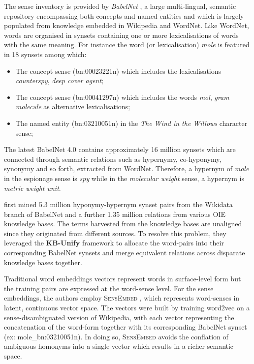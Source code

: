 The sense inventory is provided by \textit{BabelNet} \citep{navigli2012babelnet}, a large multi-lingual, semantic repository encompassing both concepts and named entities and which is largely populated from knowledge embedded in Wikipedia and WordNet.  Like WordNet, words are organised in synsets containing one or more lexicalisations of words with the same meaning.  For instance the word (or lexicalisation) \textit{mole} is featured in 18 synsets among which:
\begin{itemize}
    \item The concept  sense (bn:00023221n) which includes the lexicalisations \textit{counterspy}, \textit{deep cover agent};
    \item The concept  sense (bn:00041297n) which includes the words \textit{mol}, \textit{gram molecule} as alternative lexicalisations;
    \item The named entity  (bn:03210051n) in the \textit{The Wind in the Willows} character sense;
\end{itemize}
The latest BabelNet 4.0 contains approximately 16 million synsets which are connected through semantic relations such as hypernymy, co-hyponymy, synonymy and so forth, extracted from WordNet.  Therefore, a hypernym of \textit{mole} in the espionage sense is \textit{spy} while in the \textit{molecular weight} sense, a hypernym is \textit{metric weight unit}.

\citeauthor{espinosa2016supervised} first mined 5.3 million hyponymy-hypernym synset pairs from the Wikidata branch of BabelNet and a further 1.35 million relations from various OIE knowledge bases.  The terms harvested from the knowledge bases are unaligned since they originated from different sources.  To resolve this problem, they leveraged the \textbf{KB-Unify} framework \citep{delli2015knowledge} to allocate the word-pairs into their corresponding BabelNet synsets and merge equivalent relations across disparate knowledge bases together.

Traditional word embeddings vectors represent words in surface-level form but the training pairs are expressed at the word-sense level.  For the sense embeddings, the authors employ \textsc{SensEmbed} \citep{iacobacci2015sensembed}, which represents word-senses in latent, continuous vector space.  The vectors were built by training word2vec \citep{mikolov2013efficient} on a sense-disambiguated version of Wikipedia, with each vector representing the concatenation of the word-form together with its corresponding BabelNet synset (ex: mole\_bn:03210051n).  In doing so, \textsc{SensEmbed} avoids the conflation of ambiguous homonyms into a single vector which results in a richer semantic space.   

